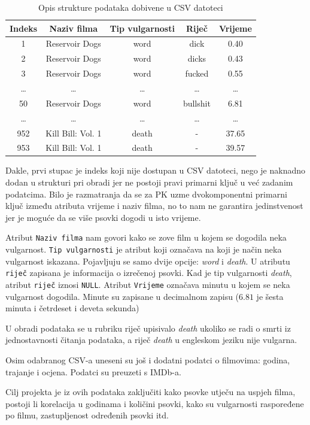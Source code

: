 \documentclass[11pt]{foi}
\begin{document}
\begin{table}[h]
	\centering
	\caption{Opis strukture podataka dobivene u CSV datoteci}
\begin{tabular}{c c c c c}
	\toprule
	Indeks& Naziv filma&Tip vulgarnosti&Riječ&Vrijeme\\
	\midrule
	1&Reservoir Dogs&word&dick&0.40\\
	2&Reservoir Dogs&word&dicks&0.43\\
	3&Reservoir Dogs&word&fucked&0.55\\
	\ldots&\ldots&\ldots&\ldots&\ldots\\
	50&Reservoir Dogs&word&bullshit&6.81\\
	\ldots&\ldots&\ldots&\ldots&\ldots\\
	952&Kill Bill: Vol. 1&death& - &37.65\\
	953&Kill Bill: Vol. 1&death& - &39.57\\
	\bottomrule
\end{tabular}
	\label{struktura_podataka}
\end{table}

Dakle, prvi stupac je indeks koji nije dostupan u CSV datoteci, nego je
naknadno dodan u strukturi pri obradi jer ne postoji pravi primarni ključ u već
zadanim podatcima. Bilo je razmatranja da se za PK uzme dvokomponentni primarni
ključ između atributa vrijeme i naziv filma, no to nam ne garantira
jedinstvenost jer je moguće da se više psovki dogodi u isto vrijeme.

Atribut \texttt{Naziv filma} nam govori kako se zove film u kojem se dogodila neka
vulgarnost. \texttt{Tip vulgarnosti} je atribut koji označava na koji je način neka
vulgarnost iskazana. Pojavljuju se samo dvije opcije: \textit{word} i
\textit{death}. U atributu \texttt{riječ} zapisana je informacija o izrečenoj
psovki. Kad je tip vulgarnosti \textit{death}, atribut \texttt{riječ} iznosi
\texttt{NULL}. Atribut \texttt{Vrijeme} označava minutu u kojem se neka
vulgarnost dogodila. Minute su zapisane u decimalnom zapisu ($6.81$ je šesta
minuta i četrdeset i deveta sekunda)

U obradi podataka se u rubriku riječ upisivalo \textit{death} ukoliko se radi o
smrti iz jednostavnosti čitanja podataka, a riječ \textit{death} u engleskom
jeziku nije vulgarna.

Osim odabranog CSV-a uneseni su još i dodatni podatci o filmovima: godina,
trajanje i ocjena. Podatci su preuzeti s IMDb-a.

Cilj projekta je iz ovih podataka zaključiti kako psovke utječu na uspjeh
filma, postoji li korelacija u godinama i količini psovki, kako su vulgarnosti
raspoređene po filmu, zastupljenost određenih psovki itd.
\end{document}
